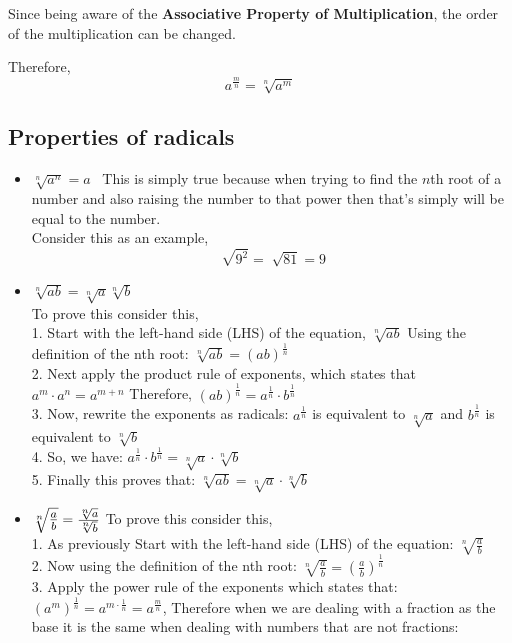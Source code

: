 Since being aware of the \textbf{Associative Property of Multiplication}, the order of the multiplication can be changed. 

Therefore, 
$$ a^{\frac{m}{n}} = \sqrt[n]{a^m} $$

\subsection{Properties of radicals}
\begin{itemize}
  \item $\sqrt[n]{a^n} = a$ \ This is simply true because when trying to find the $n$th root of a number and  also raising the number to that power then that's simply will be equal to the number.  \\
Consider this as an example,
$$ \sqrt[]{9^2} = \sqrt[]{81} = 9$$
   \item $ \sqrt[n]{ab} = \sqrt[n]{a} \sqrt[n]{b} $ \\
   To prove this consider this, \\
    1. Start with the left-hand side (LHS) of the equation,
    $ \sqrt[n]{ab} $ Using the definition of the nth root:
    $ \sqrt[n]{ab} = (ab)^{\frac{1}{n}} $ \\
    2. Next apply the product rule of exponents, which states that $ a^m \cdot a^n = a^{m+n} $ Therefore, $ (ab)^{\frac{1}{n}} = a^{\frac{1}{n}} \cdot b^{\frac{1}{n}} $ \\ 
    3. Now, rewrite the exponents as radicals:
    $ a^{\frac{1}{n}} $ is equivalent to $ \sqrt[n]{a} $ and $ b^{\frac{1}{n}} $ is equivalent to $ \sqrt[n]{b} $ \\
    4. So, we have: $ a^{\frac{1}{n}} \cdot b^{\frac{1}{n}} = \sqrt[n]{a} \cdot \sqrt[n]{b} $ \\
    5. Finally this proves that: $ \sqrt[n]{ab} = \sqrt[n]{a} \cdot \sqrt[n]{b} $
    \item $ \large \sqrt[n]{\frac{a}{b}} = \frac{\sqrt[n]{a}}{\sqrt[n]{b}} $ To prove this consider this, \\
    1. As previously Start with the left-hand side (LHS) of the equation: $ \sqrt[n]{\frac{a}{b}} $ \\
    2. Now using the definition of the nth root: $ \sqrt[n]{\frac{a}{b}} = \left(\frac{a}{b}\right)^{\frac{1}{n}} $ \\
    3. Apply the power rule of the exponents which states that: \\ $ (a^m)^{\frac{1}{n}} = a^{m \cdot \frac{1}{n}} = a^{\frac{m}{n}}$, Therefore when we are dealing with a fraction as the base it is the same when dealing with numbers that are not fractions: 

\end{itemize}
